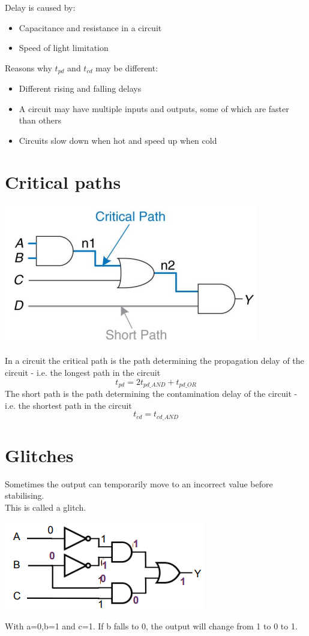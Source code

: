 \documentclass{article}[18pt]
\begin{document}
Delay is caused by:
\begin{itemize}
	\item Capacitance and resistance in a circuit
	\item Speed of light limitation
\end{itemize}
Reasons why $t_{pd}$ and $t_{cd}$ may be different:
\begin{itemize}
	\item Different rising and falling delays
	\item A circuit may have multiple inputs and outputs, some of which are faster than others
	\item Circuits slow down when hot and speed up when cold
\end{itemize}
\section{Critical paths}
\begin{center}
	\includegraphics[scale=0.7]{critical_path}
\end{center}
In a circuit the critical path is the path determining the propagation delay of the circuit - i.e. the longest path in the circuit
$$t_{pd}=2t_{pd\_AND}+t_{pd\_OR}$$
The short path is the path determining the contamination delay of the circuit - i.e. the
shortest path in the circuit
$$t_{cd}=t_{cd\_AND}$$
\section{Glitches}
Sometimes the output can temporarily move to an incorrect value before
stabilising.\\
This is called a glitch. 
\begin{center}
	\includegraphics[scale=0.7]{glitch}
\end{center}
With a=0,b=1 and c=1. If b falls to 0, the output will change from 1 to 0 to 1.
\end{document}

